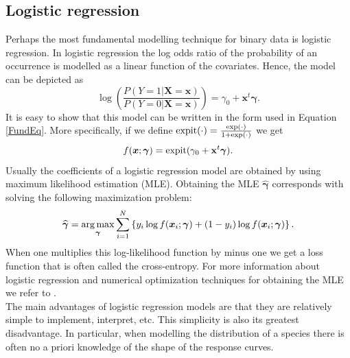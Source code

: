\subsection{Logistic regression}
Perhaps the most fundamental modelling technique for binary data is logistic regression. In logistic regression the log odds ratio of the probability of an occurrence is modelled as a linear function of the covariates. Hence, the model can be depicted as \[\log \left( \frac{P(Y=1|\bm{X} = \bm{x})}{P(Y=0|\bm{X} = \bm{x})} \right)= \gamma_0 + \bm{x}^t \bm{\gamma}.\]
It is easy to show that this model can be written in the form used in Equation \ref{FundEq}. More specifically, if we define $\text{expit}(\cdot) = \frac{\exp(\cdot)}{1+\exp(\cdot)}$ we get \[f(\bm{x};\bm{\gamma}) = \text{expit}(\gamma_0 + \mathbf{x}^t\bm{\gamma}).\] Usually the coefficients of a logistic regression model are obtained by using maximum likelihood estimation (MLE). Obtaining the MLE $\widehat{\bm{\gamma}}$ corresponds with solving the following maximization problem:
\[\widehat{\bm{\gamma}} = \operatorname*{arg\,max}_{\bm{\gamma}} \sum_{i=1}^{N} \left\lbrace y_i \log{f(\bm{x}_i;\bm{\gamma})}  + (1-y_i)\log{f(\bm{x}_i;\bm{\gamma})}  \right\rbrace.\] 
When one multiplies this log-likelihood function by minus one we get a loss function that is often called the cross-entropy. For more information about logistic regression and numerical optimization techniques for obtaining the MLE we refer to \cite{agresti_categorical_2013, mccullagh_generalized_1999}. \\

The main advantages of logistic regression models are that they are relatively simple to implement, interpret, etc. This simplicity is also its greatest disadvantage. In particular, when modelling the distribution of a species there is often no a priori knowledge of the shape of the response curves.

